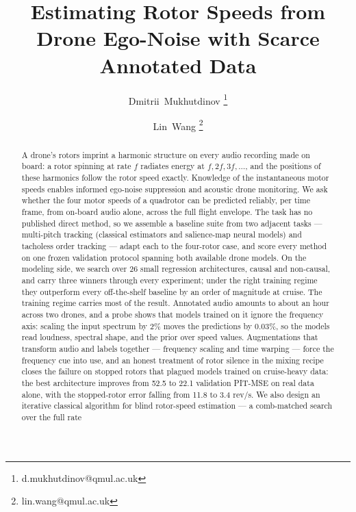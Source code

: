 \documentclass[journal]{IEEEtran}
\begin{document}
\title{Estimating Rotor Speeds from Drone Ego-Noise with Scarce
  Annotated Data}

\author[1]{Dmitrii~Mukhutdinov \thanks{d.mukhutdinov@qmul.ac.uk}}
\author[1]{Lin~Wang \thanks{lin.wang@qmul.ac.uk}}


\maketitle

\begin{abstract}
A drone's rotors imprint a harmonic structure on every audio recording made
on board: a rotor spinning at rate $f$ radiates energy at $f, 2f, 3f, \dots$,
and the positions of these harmonics follow the rotor speed exactly.
Knowledge of the instantaneous motor speeds enables informed ego-noise
suppression and acoustic drone monitoring. We ask whether the four motor
speeds of a quadrotor can be predicted reliably, per time frame, from
on-board audio alone, across the full flight envelope. The task has no
published direct method, so we assemble a baseline suite from two adjacent
tasks --- multi-pitch tracking (classical estimators and salience-map neural
models) and tacholess order tracking --- adapt each to the four-rotor case,
and score every method on one frozen validation protocol spanning both
available drone models. On the modeling side, we search over 26 small
regression architectures, causal and non-causal, and carry three winners
through every experiment; under the right training regime they outperform
every off-the-shelf baseline by an order of magnitude at cruise. The
training regime carries most of the result. Annotated audio amounts to
about an hour across two drones, and a probe shows that models trained on
it ignore the frequency axis: scaling the input spectrum by 2\% moves the
predictions by 0.03\%, so the models read loudness, spectral shape, and the
prior over speed values. Augmentations that transform audio and labels
together --- frequency scaling and time warping --- force the frequency cue
into use, and an honest treatment of rotor silence in the mixing recipe
closes the failure on stopped rotors that plagued models trained on
cruise-heavy data: the best architecture improves from 52.5 to 22.1
validation PIT-MSE on real data alone, with the stopped-rotor error
falling from 11.8 to 3.4 rev/s. We also design an iterative classical
algorithm for
blind rotor-speed estimation --- a comb-matched search over the full rate

\end{abstract}
\end{document}
